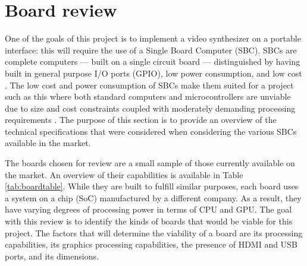 \documentclass[../initial_thesis.tex]{subfiles}
\begin{document}
\section{Board review}\label{sec:boardreview}
One of the goals of this project is to implement a video synthesizer on a portable interface: this will require the use of a Single Board Computer (SBC). SBCs are complete computers --- built on a single circuit board --- distinguished by having built in general purpose I/O ports (GPIO), low power consumption, and low cost \cite{Johnston2018}. The low cost and power consumption of SBCs make them suited for a project such as this where both standard computers and microcontrollers are unviable due to size and cost constraints coupled with moderately demanding processing requirements \cite{Johnston2018}. The purpose of this section is to provide an overview of the technical specifications that were considered when considering the various SBCs available in the market. \par

The boards chosen for review are a small sample of those currently available on the market. An overview of their capabilities is available in Table \ref{tab:boardtable}. While they are built to fulfill similar purposes, each board uses a system on a chip (SoC) manufactured by a different company. As a result, they have varying degrees of processing power in terms of CPU and GPU. The goal with this review is to identify the kinds of boards that would be viable for this project. The factors that will determine the viability of a board are its processing capabilities, its graphics processing capabilities, the presence of HDMI and USB ports, and its dimensions. \par
\end{document}
